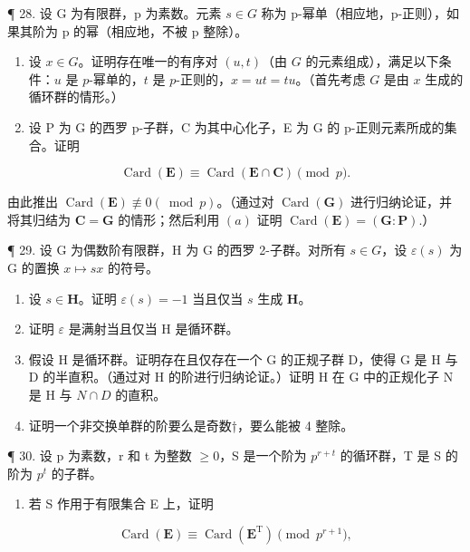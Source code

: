 ¶ 28. 设 G 为有限群，p 为素数。元素 \(s \in G\) 称为 p-幂单（相应地，p-正则），如果其阶为 p 的幂（相应地，不被 p 整除）。

\begin{enumerate}
\def\labelenumi{(\alph{enumi})}
\item
  设 \(x \in G\)。证明存在唯一的有序对 \((u, t)\)（由 \(G\) 的元素组成），满足以下条件：\(u\) 是 \(p\)-幂单的，\(t\) 是 \(p\)-正则的，\(x = ut = tu\)。（首先考虑 \(G\) 是由 \(x\) 生成的循环群的情形。）
\item
  设 P 为 G 的西罗 p-子群，C 为其中心化子，E 为 G 的 p-正则元素所成的集合。证明
\end{enumerate}

\[
\operatorname{Card} (\mathbf {E}) \equiv \operatorname{Card} (\mathbf {E} \cap \mathbf {C}) \pmod {p}.
\]

由此推出 \(\operatorname{Card}(\mathbf{E}) \not\equiv 0 (\bmod p)\)。（通过对 \(\operatorname{Card}(\mathbf{G})\) 进行归纳论证，并将其归结为 \(\mathbf{C} = \mathbf{G}\) 的情形；然后利用 \((a)\) 证明 \(\operatorname{Card}(\mathbf{E}) = (\mathbf{G}:\mathbf{P}).\)）

¶ 29. 设 G 为偶数阶有限群，H 为 G 的西罗 2-子群。对所有 \(s \in G\)，设 \(\varepsilon(s)\) 为 G 的置换 \(x \mapsto sx\) 的符号。

\begin{enumerate}
\def\labelenumi{(\alph{enumi})}
\item
  设 \(s \in \mathbf{H}\)。证明 \(\varepsilon(s) = -1\) 当且仅当 \(s\) 生成 \(\mathbf{H}\)。
\item
  证明 \(\varepsilon\) 是满射当且仅当 H 是循环群。
\item
  假设 H 是循环群。证明存在且仅存在一个 G 的正规子群 D，使得 G 是 H 与 D 的半直积。（通过对 H 的阶进行归纳论证。）证明 H 在 G 中的正规化子 N 是 H 与 \(N \cap D\) 的直积。
\item
  证明一个非交换单群的阶要么是奇数†，要么能被 4 整除。
\end{enumerate}

¶ 30. 设 p 为素数，r 和 t 为整数 \(\geqslant0\)，S 是一个阶为 \(p^{r+t}\) 的循环群，T 是 S 的阶为 \(p^{t}\) 的子群。

\begin{enumerate}
\def\labelenumi{(\alph{enumi})}
\tightlist
\item
  若 S 作用于有限集合 E 上，证明
\end{enumerate}

\[
\operatorname{Card} (\mathbf {E}) \equiv \operatorname{Card} (\mathbf {E} ^ {\mathrm{T}}) \pmod {p ^ {r + 1}},
\]


